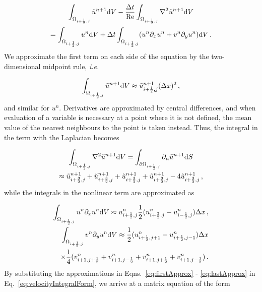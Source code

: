 \documentclass[final,3p,twocolumn]{elsarticle}
\begin{document}
\begin{multline}
    \int_{\Omega_{i+\frac{1}{2},j}} \tilde{u}^{n+1} {\rm d}V - \frac{\Delta t}{\rm Re}
    \int_{\Omega_{i+\frac{1}{2},j}} \nabla^2 \tilde{u}^{n+1} {\rm d}V \\
    = \int_{\Omega_{i+\frac{1}{2},j}} u^n {\rm d}V + \Delta t
    \int_{\Omega_{i+\frac{1}{2},j}} (u^n \partial_x u^n + v^n \partial_y u^n)
    {\rm d}V \,.
    \label{eq:velocityIntegralForm}
\end{multline}
%
We approximate the first term on each side of the equation by the
two-dimensional midpoint rule, {\em i.e.\ } 

\begin{equation}
    \int_{\Omega_{i+\frac{1}{2},j}} \tilde{u}^{n+1} {\rm d}V \approx
    \tilde{u}_{i+\frac{1}{2},j}^{n+1} (\Delta x)^2 \,, 
    \label{eq:firstApprox}
\end{equation}
%
and similar for $u^n$. Derivatives are approximated by central differences, and
when evaluation of a variable is necessary at a point where it is not defined,
the mean value of the nearest neighbours to the point is taken instead. Thus,
the integral in the term with the Laplacian becomes 

\begin{multline}
    \int_{\Omega_{i+\frac{1}{2},j}} \nabla^2 \tilde{u}^{n+1} {\rm d}V =
    \int_{\partial \Omega_{i+\frac{1}{2},j}} \partial_n \tilde{u}^{n+1} 
    {\rm d}S \\
    \approx \tilde{u}_{i+\frac{3}{2},j}^{n+1} +
    \tilde{u}_{i+\frac{3}{2},j}^{n+1} + \tilde{u}_{i+\frac{3}{2},j}^{n+1} +
    \tilde{u}_{i+\frac{3}{2},j}^{n+1} - 4\tilde{u}_{i+\frac{3}{2},j}^{n+1} \,, 
\end{multline}
%
while the integrals in the nonlinear term are approximated as 

\begin{align}
    \int_{\Omega_{i+\frac{1}{2},j}} u^n \partial_x u^n {\rm d}V \approx
    u_{i+\frac{1}{2},j}^n \frac{1}{2} (u_{i+\frac{3}{2},j}^n -
    u_{i-\frac{1}{2},j}^n) \Delta x \,, \\
    \nonumber 
    \int_{\Omega_{i+\frac{1}{2},j}} v^n \partial_y u^n {\rm d}V \approx
    \frac{1}{2}(u_{i+\frac{1}{2},j+1}^n-u_{i+\frac{1}{2},j-1}^n) \Delta x \\ 
    \label{eq:lastApprox}
    \times \frac{1}{4} (v_{i+1,j+\frac{1}{2}}^n + v_{i+1,j-\frac{1}{2}}^n +
    v_{i+1,j+\frac{1}{2}}^n + v_{i+1,j-\frac{1}{2}}^n) \,.
\end{align}
%
By substituting the approximations in Eqns.\ \eqref{eq:firstApprox} -
\eqref{eq:lastApprox} in Eq.\ \eqref{eq:velocityIntegralForm}, we arrive at a
matrix equation of the form 
\end{document}
